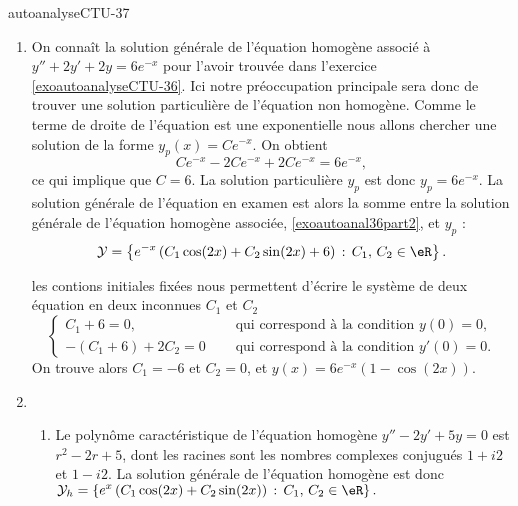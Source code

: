 
\begin{corrige}{autoanalyseCTU-37}

  \begin{enumerate}
  \item On connaît la solution générale de l'équation homogène associé à $y''+2y'+2y=6e^{-x}$ pour l'avoir trouvée dans l'exercice \ref{exoautoanalyseCTU-36}. Ici notre préoccupation principale sera donc de trouver une solution particulière de l'équation non homogène. Comme le terme de droite de l'équation est une exponentielle nous allons chercher une solution de la forme $y_p(x) =Ce^{-x} $. On obtient 
    \begin{equation*}
      Ce^{-x} -2Ce^{-x}+2Ce^{-x} = 6e^{-x}, 
    \end{equation*}
    ce qui implique que $C = 6$. La solution particulière $y_p$ est donc $y_p = 6 e^{-x}$. La solution générale de l'équation en examen est alors la somme entre la solution générale de l'équation homogène associée, \eqref{exoautoanal36part2}, et $y_p$ : 
    \begin{equation*}
      \mathcal{Y}  = \left\{ e^{-x}\left(C_1\cos(2x) +C_2\sin(2x)+ 6\right)  \,:\, C_1,\, C_2 \in \eR \right\}.
    \end{equation*} 

les contions initiales fixées nous permettent d'écrire le système de deux équation en deux inconnues $C_1$ et $C_2$ 
\begin{equation*}
  \begin{cases}
    C_1+6= 0,  & \quad\text{ qui correspond à la condition }y(0)=0,\\
    -(C_1+6) + 2C_2 = 0 & \quad\text{ qui correspond à la condition }y'(0)=0.
  \end{cases}
\end{equation*}
On trouve alors $C_1 = -6$ et $C_2 = 0$, et $y(x) = 6e^{-x}\left(1-\cos(2x)\right)$.
   \item \begin{enumerate}
  \item Le polyn\^ome caractéristique de l'équation homogène $y''-2y'+5y=0$ est $r^2-2r+5$, dont les racines sont les nombres complexes conjugués $1+i2$ et $1-i2$. La solution générale de l'équation homogène est donc $\displaystyle \mathcal{Y}_h  = \left\{ e^{x}\left(C_1\cos(2x) +C_2\sin(2x)\right)  \,:\, C_1,\, C_2 \in \eR \right\}.$


\end{enumerate}
\end{enumerate}
\end{corrige}
